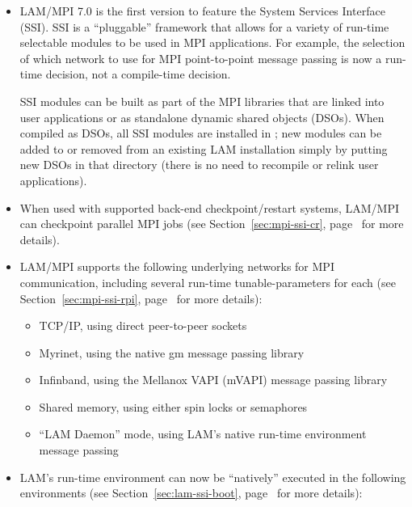 \begin{itemize}
  
\item LAM/MPI 7.0 is the first version to feature the System Services
  Interface (SSI).  SSI is a ``pluggable'' framework that allows for a
  variety of run-time selectable modules to be used in MPI
  applications.  For example, the selection of which network to use
  for MPI point-to-point message passing is now a run-time decision,
  not a compile-time decision.
  
  
  SSI modules can be built as part of the MPI libraries that are
  linked into user applications or as standalone dynamic shared
  objects (DSOs).  When compiled as DSOs, all SSI modules are
  installed in ; new modules can be added to or
  removed from an existing LAM installation simply by putting new DSOs
  in that directory (there is no need to recompile or relink user
  applications).


\item When used with supported back-end checkpoint/restart systems,
  LAM/MPI can checkpoint parallel MPI jobs (see
  Section~\ref{sec:mpi-ssi-cr}, page~\pageref{sec:mpi-ssi-cr} for more
  details).
  
\item LAM/MPI supports the following underlying networks for MPI
  communication, including several run-time tunable-parameters for
  each (see Section~\ref{sec:mpi-ssi-rpi},
  page~\pageref{sec:mpi-ssi-rpi} for more details):

  \begin{itemize}
  \item TCP/IP, using direct peer-to-peer sockets
  \item Myrinet, using the native gm message passing library
  \item Infinband, using the Mellanox VAPI (mVAPI) message passing
    library
  \item Shared memory, using either spin locks or semaphores
  \item ``LAM Daemon'' mode, using LAM's native run-time environment
    message passing
  \end{itemize}

\item LAM's run-time environment can now be ``natively'' executed in
  the following environments (see Section~\ref{sec:lam-ssi-boot},
  page~\pageref{sec:lam-ssi-boot} for more details):


\end{itemize}
